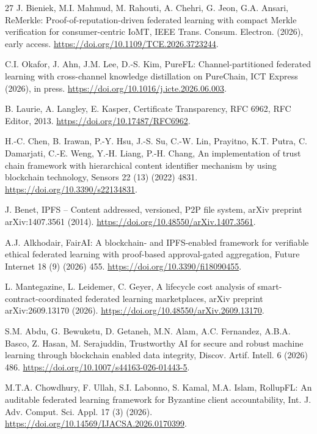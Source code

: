 \begin{thebibliography}{27}
 J. Bieniek, M.I. Mahmud, M. Rahouti, A. Chehri, G. Jeon, G.A. Ansari, ReMerkle: Proof-of-reputation-driven federated learning with compact Merkle verification for consumer-centric IoMT, IEEE Trans. Consum. Electron. (2026), early access. \url{https://doi.org/10.1109/TCE.2026.3723244}.

 C.I. Okafor, J. Ahn, J.M. Lee, D.-S. Kim, PureFL: Channel-partitioned federated learning with cross-channel knowledge distillation on PureChain, ICT Express (2026), in press. \url{https://doi.org/10.1016/j.icte.2026.06.003}.

 B. Laurie, A. Langley, E. Kasper, Certificate Transparency, RFC 6962, RFC Editor, 2013. \url{https://doi.org/10.17487/RFC6962}.

 H.-C. Chen, B. Irawan, P.-Y. Hsu, J.-S. Su, C.-W. Lin, Prayitno, K.T. Putra, C. Damarjati, C.-E. Weng, Y.-H. Liang, P.-H. Chang, An implementation of trust chain framework with hierarchical content identifier mechanism by using blockchain technology, Sensors 22 (13) (2022) 4831. \url{https://doi.org/10.3390/s22134831}.

 J. Benet, IPFS -- Content addressed, versioned, P2P file system, arXiv preprint arXiv:1407.3561 (2014). \url{https://doi.org/10.48550/arXiv.1407.3561}.

 A.J. Alkhodair, FairAI: A blockchain- and IPFS-enabled framework for verifiable ethical federated learning with proof-based approval-gated aggregation, Future Internet 18 (9) (2026) 455. \url{https://doi.org/10.3390/fi18090455}.

 L. Mantegazine, L. Leidemer, C. Geyer, A lifecycle cost analysis of smart-contract-coordinated federated learning marketplaces, arXiv preprint arXiv:2609.13170 (2026). \url{https://doi.org/10.48550/arXiv.2609.13170}.

 S.M. Abdu, G. Bewuketu, D. Getaneh, M.N. Alam, A.C. Fernandez, A.B.A. Basco, Z. Hasan, M. Serajuddin, Trustworthy AI for secure and robust machine learning through blockchain enabled data integrity, Discov. Artif. Intell. 6 (2026) 486. \url{https://doi.org/10.1007/s44163-026-01443-5}.

 M.T.A. Chowdhury, F. Ullah, S.I. Labonno, S. Kamal, M.A. Islam, RollupFL: An auditable federated learning framework for Byzantine client accountability, Int. J. Adv. Comput. Sci. Appl. 17 (3) (2026). \url{https://doi.org/10.14569/IJACSA.2026.0170399}.


\end{thebibliography}
